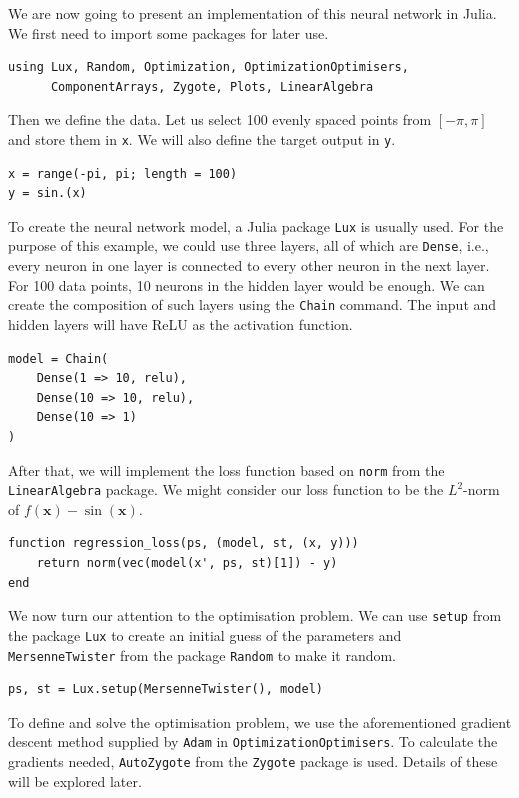 \documentclass[a4paper,11pt,titlepage]{article}
\theoremstyle{definition}
\theoremstyle{plain}
\theoremstyle{remark}
\begin{document}
We are now going to present an implementation of this neural network in Julia. We first need to import some packages for later use. 

\begin{verbatim}
using Lux, Random, Optimization, OptimizationOptimisers,
      ComponentArrays, Zygote, Plots, LinearAlgebra
\end{verbatim}

Then we define the data. Let us select 100 evenly spaced points from $[-\pi, \pi]$ and store them in \verb|x|. We will also define the target output in \verb|y|.

\begin{verbatim}
x = range(-pi, pi; length = 100)
y = sin.(x)
\end{verbatim}

To create the neural network model, a Julia package \verb|Lux| is usually used. For the purpose of this example, we could use three layers, all of which are \verb|Dense|, i.e., every neuron in one layer is connected to every other neuron in the next layer. For 100 data points, 10 neurons in the hidden layer would be enough. We can create the composition of such layers using the \verb|Chain| command. The input and hidden layers will have ReLU as the activation function.

\begin{verbatim}
model = Chain(
    Dense(1 => 10, relu),
    Dense(10 => 10, relu),
    Dense(10 => 1)
)
\end{verbatim}

After that, we will implement the loss function based on \verb|norm| from the \verb|LinearAlgebra| package. We might consider our loss function to be the $L^2$-norm of $f(\mathbf{x}) - \sin (\mathbf{x})$.

\begin{verbatim}
function regression_loss(ps, (model, st, (x, y)))
    return norm(vec(model(x', ps, st)[1]) - y)
end
\end{verbatim}

We now turn our attention to the optimisation problem. We can use \verb|setup| from the package \verb|Lux| to create an initial guess of the parameters and \verb|MersenneTwister| from the package \verb|Random| to make it random.

\begin{verbatim}
ps, st = Lux.setup(MersenneTwister(), model)
\end{verbatim}

To define and solve the optimisation problem, we use the aforementioned gradient descent method supplied by \verb|Adam| in \verb|OptimizationOptimisers|. To calculate the gradients needed, \verb|AutoZygote| from the \verb|Zygote| package is used. Details of these will be explored later.
\end{document}
